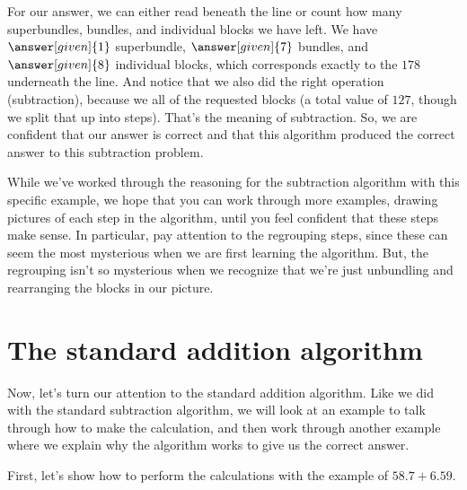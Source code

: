 \documentclass{ximera}
\begin{document}
\begin{example}
\begin{image}
\begin{tikzpicture}[every node/.style={font=\large}]
\end{tikzpicture} \end{image}

For our answer, we can either read beneath the line or count how many superbundles, bundles, and individual blocks we have left. We have $\answer[given]{1}$ superbundle, $\answer[given]{7}$ bundles, and $\answer[given]{8}$ individual blocks, which corresponds exactly to the $178$ underneath the line. And notice that we also did the right operation (subtraction), because we  all of the requested blocks (a total value of $127$, though we split that up into steps). That's the meaning of subtraction. So, we are confident that our answer is correct and that this algorithm produced the correct answer to this subtraction problem.


\end{example}

While we've worked through the reasoning for the subtraction algorithm with this specific example, we hope that you can work through more examples, drawing pictures of each step in the algorithm, until you feel confident that these steps make sense. In particular, pay attention to the regrouping steps, since these can seem the most mysterious when we are first learning the algorithm. But, the regrouping isn't so mysterious when we recognize that we're just unbundling and rearranging the blocks in our picture.


\section{The standard addition algorithm}

Now, let's turn our attention to the standard addition algorithm. Like we did with the standard subtraction algorithm, we will look at an example to talk through how to make the calculation, and then work through another example where we explain why the algorithm works to give us the correct answer.

First, let's show how to perform the calculations with the example of $58.7 + 6.59$.
\end{document}
